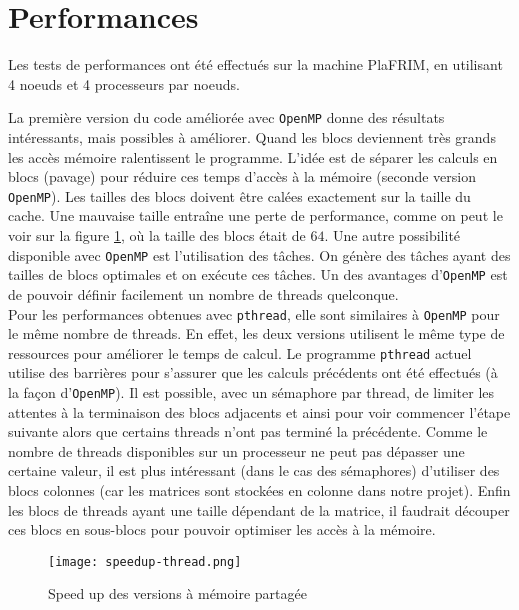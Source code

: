 \section{Performances} %
\label{sec:perf}

Les tests de performances ont été effectués sur la machine PlaFRIM, en utilisant 4 noeuds et 4 processeurs par noeuds.

La première version du code améliorée avec \texttt{OpenMP} donne des résultats intéressants, mais possibles à améliorer. Quand les blocs deviennent très grands les accès mémoire ralentissent le programme. L'idée est de séparer les calculs en blocs (pavage) pour réduire ces temps d'accès à la mémoire (seconde version \texttt{OpenMP}). Les tailles des blocs doivent être calées exactement sur la taille du cache. Une mauvaise taille entraîne une perte de performance, comme on peut le voir sur la figure \ref{fig:sp-thread}, où la taille des blocs était de $64$. Une autre possibilité disponible avec \texttt{OpenMP} est l'utilisation des tâches. On génère des tâches ayant des tailles de blocs optimales et on exécute ces tâches. Un des avantages d'\texttt{OpenMP} est de pouvoir définir facilement un nombre de threads quelconque.\\

Pour les performances obtenues avec \texttt{pthread}, elle sont similaires à \texttt{OpenMP} pour le même nombre de threads. En effet, les deux versions utilisent le même type de ressources pour améliorer le temps de calcul. Le programme \texttt{pthread} actuel utilise des barrières pour s'assurer que les calculs précédents ont été effectués (à la façon d'\texttt{OpenMP}). Il est possible, avec un sémaphore par thread, de limiter les attentes à la terminaison des blocs adjacents et ainsi pour voir commencer l'étape suivante alors que certains threads n'ont pas terminé la précédente. Comme le nombre de threads disponibles sur un processeur ne peut pas dépasser une certaine valeur, il est plus intéressant (dans le cas des sémaphores) d'utiliser des blocs colonnes (car les matrices sont stockées en colonne dans notre projet). Enfin les blocs de threads ayant une taille dépendant de la matrice, il faudrait découper ces blocs en sous-blocs pour pouvoir optimiser les accès à la mémoire.


\begin{figure}[!ht]
\centering
\texttt{[image: speedup-thread.png]}
\caption{Speed up des versions à mémoire partagée}
\label{fig:sp-thread}
\end{figure}

